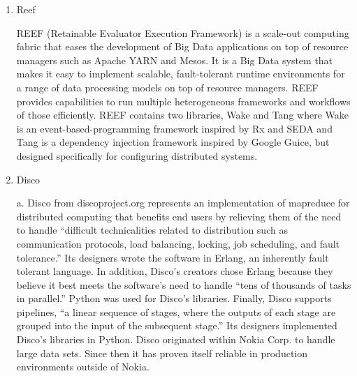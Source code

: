 \begin{enumerate}
\item {} 
Reef

REEF (Retainable Evaluator Execution Framework) \label{\detokenize{i524/technologies:id285}}{\hyperref[\detokenize{i524/technologies:www-reef}]{\sphinxcrossref{{[}239{]}}}}
is a scale-out computing fabric that eases the development of Big
Data applications on top of resource managers such as Apache YARN
and Mesos. It is a Big Data system that makes it easy to
implement scalable, fault-tolerant runtime environments for a
range of data processing models on top of resource managers. REEF
provides capabilities to run multiple heterogeneous frameworks
and workflows of those efficiently. REEF contains two libraries,
Wake and Tang where Wake is an event-based-programming framework
inspired by Rx and SEDA and Tang is a dependency injection
framework inspired by Google Guice, but designed specifically for
configuring distributed systems.

\item {} 
Disco

a. Disco from discoproject.org represents an implementation of
mapreduce for distributed computing that benefits end users by
relieving them of the need to handle “difficult technicalities
related to distribution such as communication protocols, load
balancing, locking, job scheduling, and fault tolerance.”
\label{\detokenize{i524/technologies:id286}}{\hyperref[\detokenize{i524/technologies:www-whatis-discoproject}]{\sphinxcrossref{{[}240{]}}}} Its designers wrote the software
in Erlang, an inherently fault tolerant language. In addition,
Disco’s creators chose Erlang because they believe it best meets
the software’s need to handle “tens of thousands of tasks in
parallel.” \label{\detokenize{i524/technologies:id287}}{\hyperref[\detokenize{i524/technologies:www-erlangprime-discoproject}]{\sphinxcrossref{{[}241{]}}}} Python was used
for Disco’s libraries. Finally, Disco supports pipelines, “a
linear sequence of stages, where the outputs of each stage are
grouped into the input of the subsequent stage.”
\label{\detokenize{i524/technologies:id288}}{\hyperref[\detokenize{i524/technologies:www-clarridge-discoproject}]{\sphinxcrossref{{[}242{]}}}} Its designers implemented
Disco’s libraries in Python. Disco originated within Nokia
Corp. to handle large data sets.  Since then it has proven itself
reliable in production environments outside of
Nokia. \label{\detokenize{i524/technologies:id289}}{\hyperref[\detokenize{i524/technologies:www-nokia-discoproject}]{\sphinxcrossref{{[}243{]}}}}


\end{enumerate}
